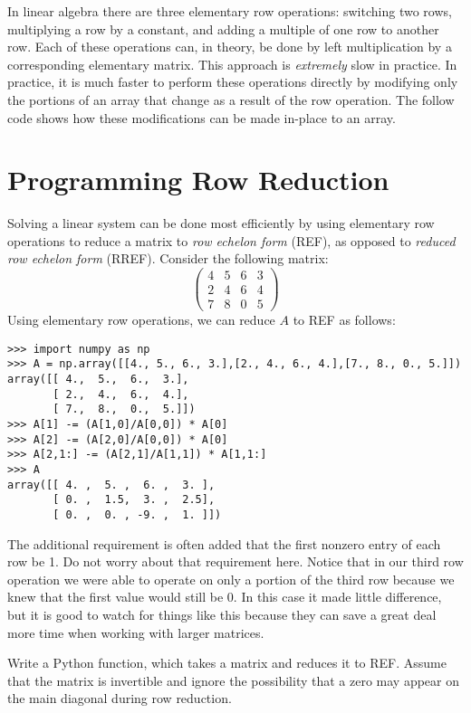 \label{lab:LUdecomp}

In linear algebra there are three elementary row operations: switching two rows, multiplying a row by a constant, and adding a multiple of one row to another row.
Each of these operations can, in theory, be done by left multiplication by a corresponding elementary matrix.
This approach is \emph{extremely} slow in practice.
In practice, it is much faster to perform these operations directly by modifying only the portions of an array that change as a result of the row operation.
The follow code shows how these modifications can be made in-place to an array.


\section*{Programming Row Reduction}
Solving a linear system can be done most efficiently by using elementary row operations to reduce a matrix to \emph{row echelon form} (REF), as opposed to \emph{reduced row echelon form} (RREF).
Consider the following matrix: 
\[
\begin{pmatrix}
4&5&6&3 \\
2&4&6&4 \\
7&8&0&5
\end{pmatrix}
\]
Using elementary row operations, we can reduce $A$ to REF as follows:
\begin{lstlisting}
>>> import numpy as np
>>> A = np.array([[4., 5., 6., 3.],[2., 4., 6., 4.],[7., 8., 0., 5.]])
array([[ 4.,  5.,  6.,  3.],
       [ 2.,  4.,  6.,  4.],
       [ 7.,  8.,  0.,  5.]])
>>> A[1] -= (A[1,0]/A[0,0]) * A[0]
>>> A[2] -= (A[2,0]/A[0,0]) * A[0]
>>> A[2,1:] -= (A[2,1]/A[1,1]) * A[1,1:]
>>> A
array([[ 4. ,  5. ,  6. ,  3. ],
       [ 0. ,  1.5,  3. ,  2.5],
       [ 0. ,  0. , -9. ,  1. ]])
\end{lstlisting}
The additional requirement is often added that the first nonzero entry of each row be 1.
Do not worry about that requirement here.
Notice that in our third row operation we were able to operate on only a portion of the third row because we knew that the first value would still be 0.
In this case it made little difference, but it is good to watch for things like this because they can save a great deal more time when working with larger matrices.

\begin{problem}
\label{prob:REF}
Write a Python function, which takes a matrix and reduces it to REF.
Assume that the matrix is invertible and ignore the possibility that a zero may appear on the main diagonal during row reduction.
\end{problem}

